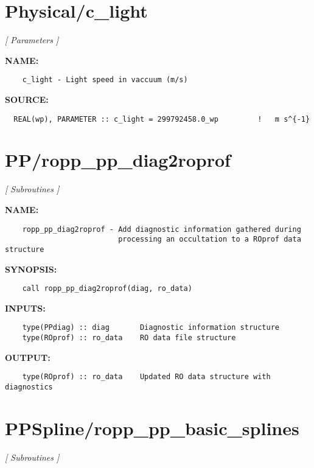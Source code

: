\section{Physical/c\_light}
\textsl{[ Parameters ]}

\label{ch:robo53}
\label{ch:Physical_c_light}
\textbf{NAME:}\hspace{0.08in}\begin{Verbatim}
    c_light - Light speed in vaccuum (m/s)
\end{Verbatim}
\textbf{SOURCE:}\hspace{0.08in}\begin{Verbatim}
  REAL(wp), PARAMETER :: c_light = 299792458.0_wp         !   m s^{-1}
\end{Verbatim}
\section{PP/ropp\_pp\_diag2roprof}
\textsl{[ Subroutines ]}

\label{ch:robo54}
\label{ch:PP_ropp_pp_diag2roprof}
\textbf{NAME:}\hspace{0.08in}\begin{Verbatim}
    ropp_pp_diag2roprof - Add diagnostic information gathered during 
                          processing an occultation to a ROprof data structure
\end{Verbatim}
\textbf{SYNOPSIS:}\hspace{0.08in}\begin{Verbatim}
    call ropp_pp_diag2roprof(diag, ro_data)
\end{Verbatim}
\textbf{INPUTS:}\hspace{0.08in}\begin{Verbatim}
    type(PPdiag) :: diag       Diagnostic information structure
    type(ROprof) :: ro_data    RO data file structure
\end{Verbatim}
\textbf{OUTPUT:}\hspace{0.08in}\begin{Verbatim}
    type(ROprof) :: ro_data    Updated RO data structure with diagnostics
\end{Verbatim}
\section{PPSpline/ropp\_pp\_basic\_splines}
\textsl{[ Subroutines ]}

